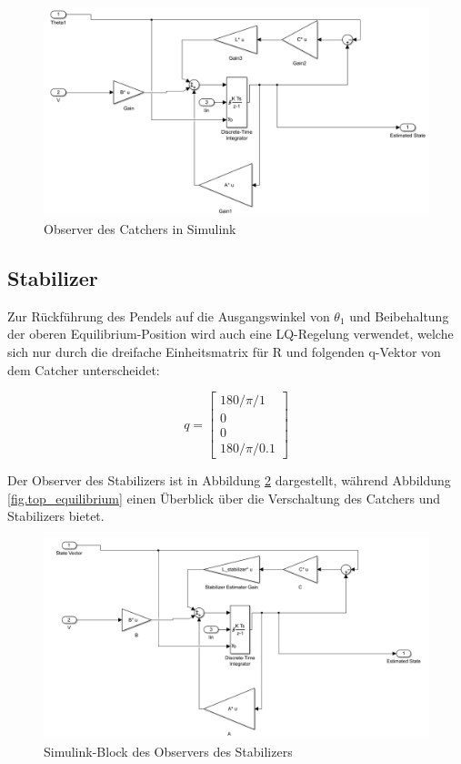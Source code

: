 \begin{figure}[htbp]
	\centering	
	\includegraphics[width=1\textwidth]{Grafiken/simulink_observer_catcher.png}
	\caption{Observer des Catchers in Simulink}
	\label{fig.obs_catcher}
\end{figure}

\subsection{Stabilizer}
\label{stabilizer} 

Zur Rückführung des Pendels auf die Ausgangswinkel von $\theta_1$ und Beibehaltung der oberen Equilibrium-Position wird auch eine LQ-Regelung verwendet, welche sich nur durch die dreifache Einheitsmatrix für R und folgenden q-Vektor von dem Catcher unterscheidet:

\begin{equation}
q =\begin{bmatrix}
         180/\pi/1 \\
         0\\
         0\\
         180/\pi/0.1
        \end{bmatrix}
\end{equation}

Der Observer des Stabilizers ist in Abbildung \ref{fig.obs_stabilizer} dargestellt, während Abbildung \ref{fig.top_equilibrium} einen Überblick über die Verschaltung des Catchers und Stabilizers bietet.

\begin{figure}[htbp]
	\centering	
	\includegraphics[width=1\textwidth]{Grafiken/simulink_observer_stabilizer.png}
	\caption{Simulink-Block des Observers des Stabilizers}
	\label{fig.obs_stabilizer}
\end{figure}

